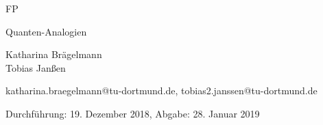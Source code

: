 \newcommand{\Titel}{Quanten-Analogien}
\newcommand{\DatumDu}{19. Dezember 2018}
\newcommand{\DatumAb}{28. Januar 2019}
\newcommand{\Autoreins}{Katharina Brägelmann}
\newcommand{\Emaileins}{katharina.braegelmann@tu-dortmund.de}
\newcommand{\Autorzwei}{Tobias Janßen}
\newcommand{\Emailzwei}{tobias2.janssen@tu-dortmund.de}



\begin{titlepage}

\begin{center} \large

  FP
  \vspace*{2.5cm}

  {\huge \Titel}
  \vspace*{3cm}

  \Autoreins
  \\\Autorzwei
  \vspace*{1.5cm}

  \Emaileins, \Emailzwei


  Durchführung: \DatumDu, Abgabe: \DatumAb
  \vspace*{4.5cm}


\end{center}
\end{titlepage}
